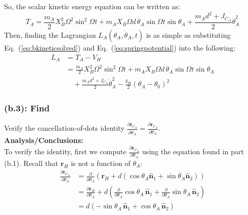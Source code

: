 \documentclass[titlepage]{article}
\begin{document}
\begin{mdframed}[linewidth=1pt, innertopmargin=10pt, innerbottommargin=10pt]
	So, the scalar kinetic energy equation can be written as:
	\begin{equation}
		T_A=\frac{m_A}{2}X_B^2\Omega^2\sin^2\Omega t+m_AX_B\Omega d\,\dot{\theta}_A\sin\Omega t\sin\theta_A+\frac{m_Ad^2+J_{C_A}}{2}\dot{\theta}_A^2
		\label{eq:bkineticsolved}
	\end{equation}
	Then, finding the Lagrangian $L_A(\theta_A,\dot{\theta}_A,t)$ is as simple as substituting Eq.~(\ref{eq:bkineticsolved}) and Eq.~(\ref{eq:springpotential}) into the following:
	\begin{equation}
		\begin{split}
			L_A&=T_A-V_H \\
			&=\frac{m_A}{2}X_B^2\Omega^2\sin^2\Omega t+m_AX_B\Omega d\,\dot{\theta}_A\sin\Omega t\sin\theta_A\\ &\quad+\frac{m_Ad^2+J_{C_A}}{2}\dot{\theta}_A^2-\frac{k_H}{2}\left(\theta_A-\theta_0\right)^2
		\end{split}
		\label{eq:blagrangian}
	\end{equation}
\end{mdframed}

\subsubsection*{(b.3): Find}
Verify the cancellation-of-dots identity $\frac{\partial\dot{\boldsymbol{r}}_{C_A}}{\partial\dot{\theta}_A}=\frac{\partial\boldsymbol{r}_{C_A}}{\partial\theta_A}$.\\

\textbf{Analysis/Conclusions:}\\
To verify the identity, first we compute $\frac{\partial\boldsymbol{r}_{C_A}}{\partial\theta_A}$ using the equation found in part (b.1). Recall that $\boldsymbol{r}_H$ is not a function of $\theta_A$:
\begin{equation}
	\begin{split}
		\frac{\partial\boldsymbol{r}_{C_A}}{\partial\theta_A}&=\frac{\partial}{\partial\theta_A}\left(\boldsymbol{r}_H+d\left(\cos\theta_A\hat{\boldsymbol{n}}_1+\sin\theta_A\hat{\boldsymbol{n}}_2\right)\right) \\
		&=\frac{\partial\boldsymbol{r}_H}{\partial\theta_A}+d\left(\frac{\partial}{\partial\theta_A}\cos\theta_A\,\hat{\boldsymbol{n}}_1+\frac{\partial}{\partial\theta_A}\sin\theta_A\,\hat{\boldsymbol{n}}_2\right) \\
		&=d\left(-\sin\theta_A\,\hat{\boldsymbol{n}}_1+\cos\theta_A\,\hat{\boldsymbol{n}}_2\right) \\
	\end{split}
\end{equation}
\end{document}
